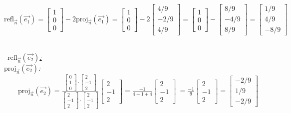 \documentclass{article}
\begin{document}
 \\\\
$
\text{refl}_{\vec{n}}(\vec{e_1})=
\begin{bmatrix}1\\0\\0\end{bmatrix}
-2\text{proj}_{\vec{n}}(\vec{e_1})
=\begin{bmatrix}1\\0\\0\end{bmatrix}-2\begin{bmatrix}4/9\\-2/9\\4/9\end{bmatrix}
=\begin{bmatrix}1\\0\\0\end{bmatrix}-\begin{bmatrix}8/9\\-4/9\\8/9\end{bmatrix}
=\begin{bmatrix}1/9\\4/9\\-8/9\end{bmatrix}$




 \\ \underline{\textit{$\text{refl}_{\vec{n}}(\vec{e_2})$:}}\\
\textit{$\text{proj}_{\vec{n}}(\vec{e_2})$:}\\
$\text{
      proj}_{\vec{n}}(\vec{e_2})=\frac
{
\begin{bmatrix}0\\1\\0\end{bmatrix}\cdot\begin{bmatrix}2\\-1\\2\end{bmatrix}
}{
\begin{bmatrix}2\\-1\\2\end{bmatrix}\cdot\begin{bmatrix}2\\-1\\2\end{bmatrix}
}
\begin{bmatrix}2\\-1\\2\end{bmatrix}
=\frac{-1}{4+1+4}\begin{bmatrix}2\\-1\\2\end{bmatrix}\
=\frac{-1}{9}\begin{bmatrix}2\\-1\\2\end{bmatrix}
=\begin{bmatrix}-2/9\\1/9\\-2/9\end{bmatrix}$
\end{document}
